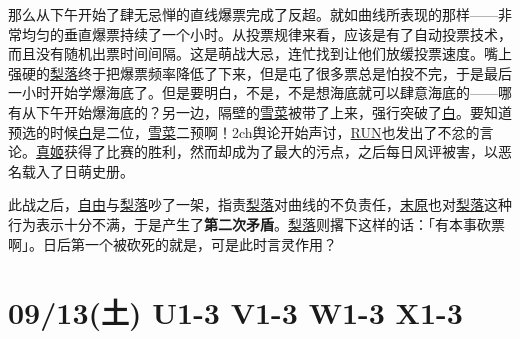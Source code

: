 那么从下午开始了肆无忌惮的直线爆票完成了反超。就如曲线所表现的那样——非常均匀的垂直爆票持续了一个小时。从投票规律来看，应该是有了自动投票技术，而且没有随机出票时间间隔。这是萌战大忌，连忙找到让他们放缓投票速度。嘴上强硬的\uline{梨落}终于把爆票频率降低了下来，但是屯了很多票总是怕投不完，于是最后一小时开始学爆海底了。但是要明白，不是，不是想海底就可以肆意海底的——哪有从下午开始爆海底的？另一边，隔壁的\uline{雪菜}被带了上来，强行突破了\uline{白}。要知道预选的时候\uline{白}是二位，\uline{雪菜}二预啊！2ch舆论开始声讨，\uline{RUN}也发出了不忿的言论。\uline{真姬}获得了比赛的胜利，然而却成为了最大的污点，之后每日风评被害，以恶名载入了日萌史册。

此战之后，\uline{自由}与\uline{梨落}吵了一架，指责\uline{梨落}对曲线的不负责任，\uline{末原}也对\uline{梨落}这种行为表示十分不满，于是产生了\textbf{第二次矛盾}。\uline{梨落}则撂下这样的话：「有本事砍票啊」。日后第一个被砍死的就是，可是此时言灵作用？

\section{09/13(土) U1-3 V1-3 W1-3 X1-3}


